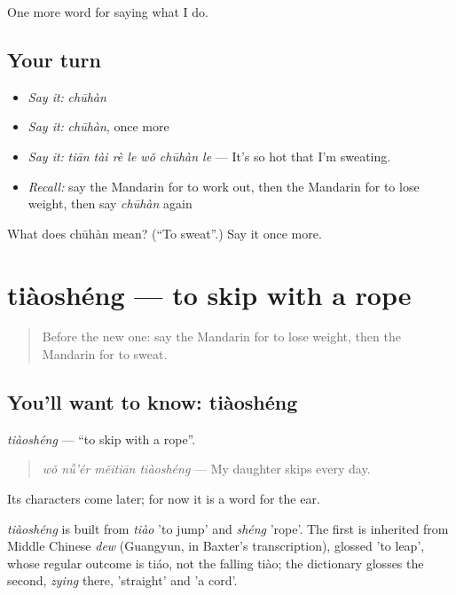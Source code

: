 \begin{grammarlens}[title={What you've built}]
One more word for saying what I do.
\end{grammarlens}

\subsection*{Your turn}
\begin{itemize}
\raggedright
  \item \emph{Say it:} \emph{chūhàn}
  \item \emph{Say it:} \emph{chūhàn}, once more
  \item \emph{Say it:} \emph{tiān tài rè le wǒ chūhàn le} — It's so hot that I'm sweating.
  \item \emph{Recall:} say the Mandarin for to work out, then the Mandarin for to lose weight, then say \emph{chūhàn} again
\end{itemize}

\begin{tcolorbox}[breakable,colback=teal!4,colframe=teal!35!black,title={Before you move on}]
What does chūhàn mean? (\textquotedblleft{}To sweat\textquotedblright{}.) Say it once more.
\end{tcolorbox}
\section[tiàoshéng]{tiàoshéng — to skip with a rope}

\label{lesson:ZH-C220-tiaosheng}



\begin{quote}
Before the new one: say the Mandarin for to lose weight, then the Mandarin for to sweat.
\end{quote}

\subsection*{You'll want to know: tiàoshéng}
\emph{tiàoshéng} — \textquotedblleft{}to skip with a rope\textquotedblright{}.

\begin{quote}
\emph{wǒ nǚ'ér měitiān tiàoshéng} — My daughter skips every day.
\end{quote}

Its characters come later; for now it is a word for the ear.

\begin{cousinweb}
\emph{tiàoshéng} is built from \emph{tiào} 'to jump' and \emph{shéng} 'rope'. The first is inherited from Middle Chinese \emph{dew} (Guangyun, in Baxter's transcription), glossed 'to leap', whose regular outcome is tiáo, not the falling tiào; the dictionary glosses the second, \emph{zying} there, 'straight' and 'a cord'.
\end{cousinweb}

